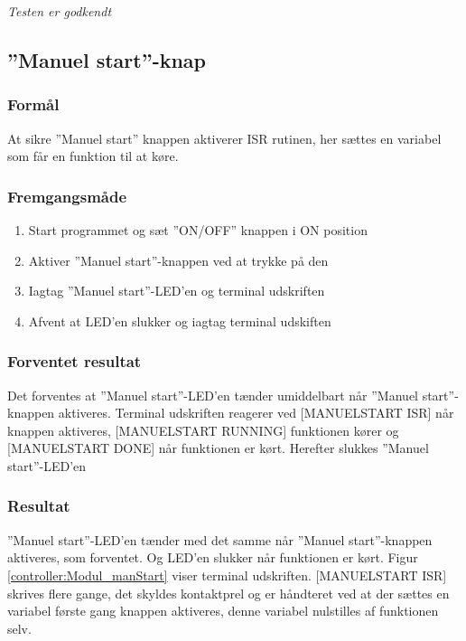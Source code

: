 \textit{Testen er godkendt}


\subsection*{''Manuel start''-knap}

\subsubsection*{Formål}
At sikre ''Manuel start'' knappen aktiverer ISR rutinen, her sættes en variabel som får en funktion til at køre. 

\subsubsection*{Fremgangsmåde}
\begin{enumerate}
\item Start programmet og sæt ''ON/OFF'' knappen i ON position
\item Aktiver ''Manuel start''-knappen ved at trykke på den 
\item Iagtag ''Manuel start''-LED'en og terminal udskriften
\item Afvent at LED'en slukker og iagtag terminal udskiften 
\end{enumerate}

\subsubsection*{Forventet resultat} 
Det forventes at ''Manuel start''-LED'en tænder umiddelbart når ''Manuel start''-knappen aktiveres. Terminal udskriften reagerer ved [MANUELSTART ISR] når knappen aktiveres, [MANUELSTART RUNNING] funktionen kører og [MANUELSTART DONE] når funktionen er kørt. Herefter slukkes ''Manuel start''-LED'en 

\subsubsection*{Resultat} 
''Manuel start''-LED'en tænder med det samme når ''Manuel start''-knappen aktiveres, som forventet. Og LED'en slukker når funktionen er kørt. Figur \ref{controller:Modul_manStart} viser terminal udskriften. [MANUELSTART ISR] skrives flere gange, det skyldes kontaktprel og er håndteret ved at der sættes en variabel første gang knappen aktiveres, denne variabel nulstilles af funktionen selv.




